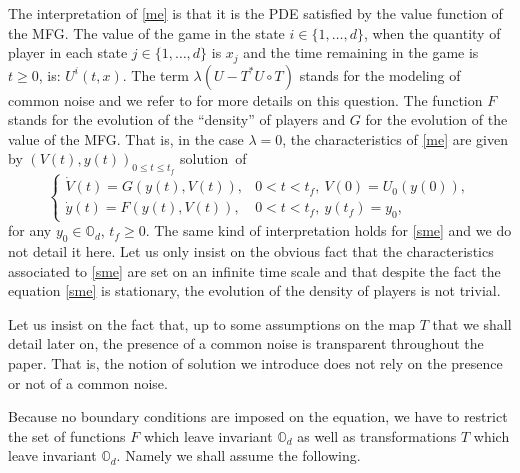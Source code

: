 \documentclass[JEP,XML,SOM,Unicode,NoEqCountersInSection,published]{cedram}
\theoremstyle{definition}
\begin{document}
The interpretation of \eqref{me} is that it is the PDE satisfied by the value function of the MFG. The value of the game in the state $i\in \{1,\dots,d\}$, when the quantity of player in each state $j \in \{1,\dots,d\}$ is $x_j$ and the time remaining in the game is $t\geq 0$, is: $U^i(t,x)$. The term $\lambda(U-T^* U\circ T)$ stands for the modeling of common noise and we refer to \cite{bertucci2019some} for more details on this question. The function $F$ stands for the evolution of the ``density'' of players and $G$ for the evolution of the value of the MFG. That is, in the case $\lambda = 0$, the characteristics of \eqref{me} are given by $(V(t), y(t))_{0\leq t \leq t_f}$ solution~of%
\begin{equation}\label{char}
\begin{cases}
\dot{V}(t) = G(y(t),V(t)),& 0 < t < t_f ,\ V(0) = U_0(y(0)),\\
\dot{y}(t) = F(y(t),V(t)),& 0<t<t_f,\ y(t_f) = y_0,
\end{cases}
\end{equation}
for any $y_0 \in \mathbb{O}_d$, $t_f \geq 0$. The same kind of interpretation holds for \eqref{sme} and we do not detail it here. Let us only insist on the obvious fact that the characteristics associated to \eqref{sme} are set on an infinite time scale and that despite the fact the equation \eqref{sme} is stationary, the evolution of the density of players is not trivial.

Let us insist on the fact that, up to some assumptions on the map $T$ that we shall detail later on, the presence of a common noise is transparent throughout the paper. That is, the notion of solution we introduce does not rely on the presence or not of a common noise.

Because no boundary conditions are imposed on the equation, we have to restrict the set of functions $F$ which leave invariant $\mathbb{O}_d$ as well as transformations $T$ which leave invariant $\mathbb{O}_d$. Namely we shall assume the following.
\end{document}
